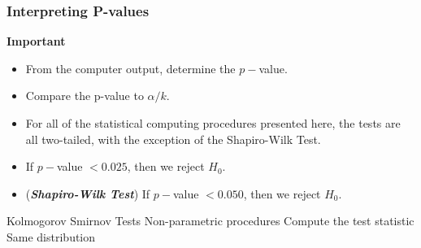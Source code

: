 \begin{frame}
	\frametitle{Interpreting P-values}
	\textbf{Important}
	\begin{itemize}
		\item From the computer output, determine the $p-$value. \smallskip 
		\item Compare the p-value to $\alpha/k$. \smallskip 
		\item For all of the statistical computing procedures presented here, the tests are all two-tailed, with the exception of the Shapiro-Wilk Test. \smallskip 
		\item If $p-$value $< 0.025$, then we reject $H_0$. \smallskip 
		\item (\textbf{\textit{Shapiro-Wilk Test}}) If $p-$value $< 0.050$, then we reject $H_0$.
	\end{itemize}
\end{frame}	



Kolmogorov Smirnov Tests
Non-parametric procedures
Compute the test statistic
Same distribution
